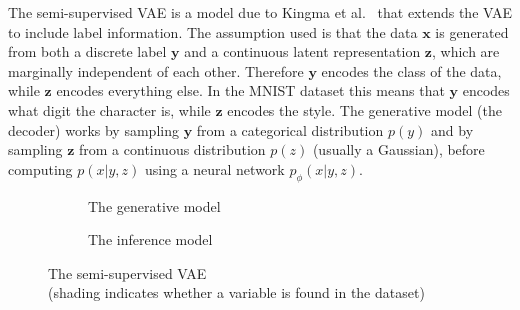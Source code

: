 \documentclass[12pt,a4paper,twoside,openright]{report}
\renewcommand{\vec}[1]{\bm{#1}}
\begin{document}
The semi-supervised VAE is a model due to Kingma et al.~\cite{DBLP:journals/corr/KingmaRMW14} that extends the VAE to include label information. 
The assumption used is that the data $\vec{x}$ is generated from both a discrete label $\vec{y}$ and a continuous latent representation 
$\vec{z}$, which are marginally independent of each other.
Therefore $\vec{y}$ encodes the class of the data, while $\vec{z}$ encodes everything else. In the MNIST dataset this means that $\vec{y}$ encodes
what digit the character is, while $\vec{z}$ encodes the style. The generative model (the decoder) works by sampling $\vec{y}$ from a 
categorical distribution $p(y)$ and by sampling $\vec{z}$ from a continuous distribution $p(z)$ (usually a Gaussian), before computing 
$p(x|y, z)$ using a neural network $p_{\phi}(x|y, z)$.
\begin{figure}[H]
  \centering
  \begin{subfigure}[b]{0.4\linewidth}
    \centering
    \caption{The generative model}
  \end{subfigure}
  \begin{subfigure}[b]{0.4\linewidth}
    \centering
    \caption{The inference model}
  \end{subfigure}
  \caption[Semi-supervised VAE]{The semi-supervised VAE \\ (shading indicates whether a variable is found in the dataset)}
  \label{fig:digit}
\end{figure}
\end{document}
